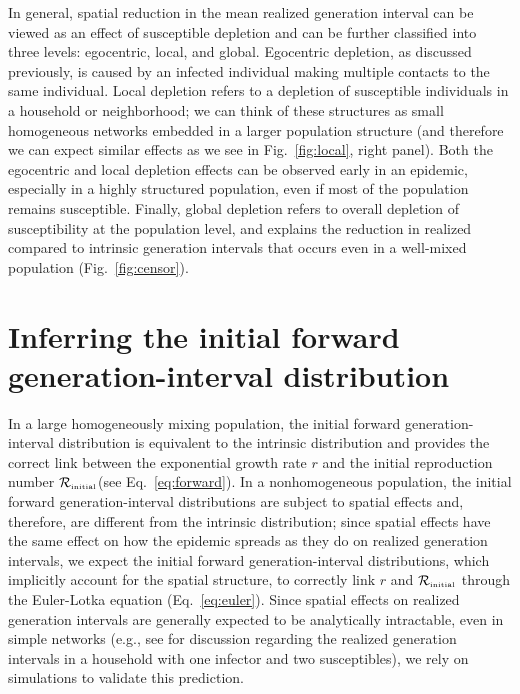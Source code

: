 \documentclass[12pt]{article}
\newcommand{\eref}[1]{Eq.~\ref{eq:#1}}
\newcommand{\fref}[1]{Fig.~\ref{fig:#1}}
\newcommand{\Rx}[1]{\ensuremath{{\mathcal R}_{#1}}\xspace}
\newcommand{\Rini}{\Rx{\textrm{\tiny initial}}}
\begin{document}
In general, spatial reduction in the mean realized generation interval can be viewed as an effect of susceptible depletion and can be further classified into three levels: egocentric, local, and global.
Egocentric depletion, as discussed previously, is caused by an infected individual making multiple contacts to the same individual.
Local depletion refers to a depletion of susceptible individuals in a household or neighborhood;
we can think of these structures as small homogeneous networks embedded in a larger population structure (and therefore we can expect similar effects as we see in \fref{local}, right panel).
Both the egocentric and local depletion effects can be observed early in an epidemic, especially in a highly structured population, even if most of the population remains susceptible.
Finally, global depletion refers to overall depletion of susceptibility at the population level, and explains the reduction in realized compared to intrinsic generation intervals that occurs even in a well-mixed population (\fref{censor}). 

\section{Inferring the initial forward generation-interval distribution}

In a large homogeneously mixing population, the initial forward generation-interval distribution is equivalent to the intrinsic distribution and provides the correct link between the exponential growth rate $r$ and the initial reproduction number \Rini (see \eref{forward}).
In a nonhomogeneous population, the initial forward generation-interval distributions are subject to spatial effects and, therefore, are different from the intrinsic distribution;
since spatial effects have the same effect on how the epidemic spreads as they do on realized generation intervals, we expect the initial forward generation-interval distributions, which implicitly account for the spatial structure, to correctly link $r$ and $\Rini$ through the Euler-Lotka equation (\eref{euler}).
Since spatial effects on realized generation intervals are generally expected to be analytically intractable, even in simple networks (e.g., see \cite{tomba2010some} for discussion regarding the realized generation intervals in a household with one infector and two susceptibles), we rely on simulations to validate this prediction.
\end{document}
